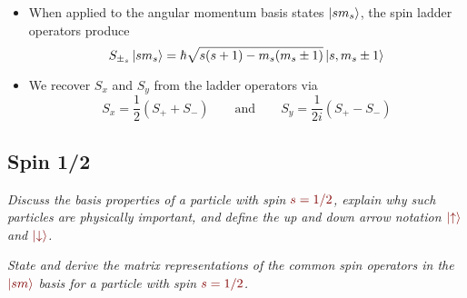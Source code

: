 \documentclass[11pt, a4paper]{article}
\newcommand{\qmath}[1]{\textcolor{Maroon}{#1}}  %
\newcommand{\eqtext}[1]{\qquad \text{#1} \qquad}
\newcommand{\ua}{\uparrow}  %
\newcommand{\da}{\downarrow}  %
\begin{document}
\begin{itemize}
\begin{itemize}
        \item When applied to the angular momentum basis states $ \ket{sm_{s}} $, the spin ladder operators produce
        \begin{equation*}
            S_{\pm_{s}} \ket{sm_{s}} = \hbar \sqrt{s(s+1) - m_{s}(m_{s} \pm 1)}\ket{s, m_{s} \pm 1}
        \end{equation*}

        \item We recover $ S_{x} $ and $ S_{y} $ from the ladder operators via
        \begin{equation*}
            S_{x} = \frac{1}{2}(S_{+} + S_{-}) \eqtext{and} S_{y} = \frac{1}{2i}(S_{+} - S_{-}) 
        \end{equation*}
    \end{itemize}
	
\end{itemize}


\subsection{Spin 1/2}
\textit{Discuss the basis properties of a particle with spin $ \qmath{s = 1/2} $, explain why such particles are physically important, and define the up and down arrow notation $ \qmath{\ket{\ua}} $ and $ \qmath{\ket{\da}} $.}

\vspace{2mm}
\textit{State and derive the matrix representations of the common spin operators in the $ \qmath{\ket{sm}} $ basis for a particle with spin $ \qmath{s = 1/2} $.}
\end{document}
